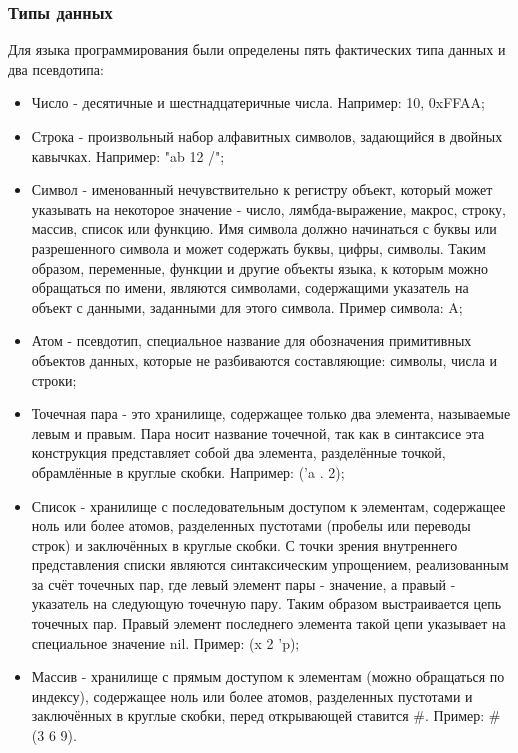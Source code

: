 \subsubsection{Типы данных}
Для языка программирования были определены пять фактических типа данных и два псевдотипа:
\begin{itemize}
	\item Число - десятичные и шестнадцатеричные числа. Например: 10, 0xFFAA;
	
	\item Строка - произвольный набор алфавитных символов, задающийся в двойных кавычках. Например: "ab 12 /";
	
	\item Символ - именованный нечувствительно к регистру объект, который может указывать на некоторое значение - число, лямбда-выражение, макрос, строку, массив, список или функцию. Имя символа должно начинаться с буквы или разрешенного символа и может содержать буквы, цифры, символы. Таким образом, переменные, функции и другие объекты языка, к которым можно обращаться по имени, являются символами, содержащими указатель на объект с данными, заданными для этого символа. Пример символа: A;
	
	\item Атом - псевдотип, специальное название для обозначения примитивных объектов данных, которые не разбиваются составляющие: символы, числа и строки;
	
	\item Точечная пара - это хранилище, содержащее только два элемента, называемые левым и правым. Пара носит название точечной, так как в синтаксисе эта конструкция представляет собой два элемента, разделённые точкой, обрамлённые в круглые скобки. Например: ('a . 2);
	
	\item Список - хранилище с последовательным доступом к элементам, содержащее ноль или более атомов, разделенных пустотами (пробелы или переводы строк) и заключённых в круглые скобки. С точки зрения внутреннего представления списки являются синтаксическим упрощением, реализованным за счёт точечных пар, где левый элемент пары - значение, а правый - указатель на следующую точечную пару. Таким образом выстраивается цепь точечных пар. Правый элемент последнего элемента такой цепи указывает на специальное значение nil. Пример: (x 2 'p);
	
	\item Массив - хранилище с прямым доступом к элементам (можно обращаться по индексу), содержащее ноль или более атомов, разделенных пустотами и заключённых в круглые скобки, перед открывающей ставится \#. Пример: \#(3 6 9).
\end{itemize}

